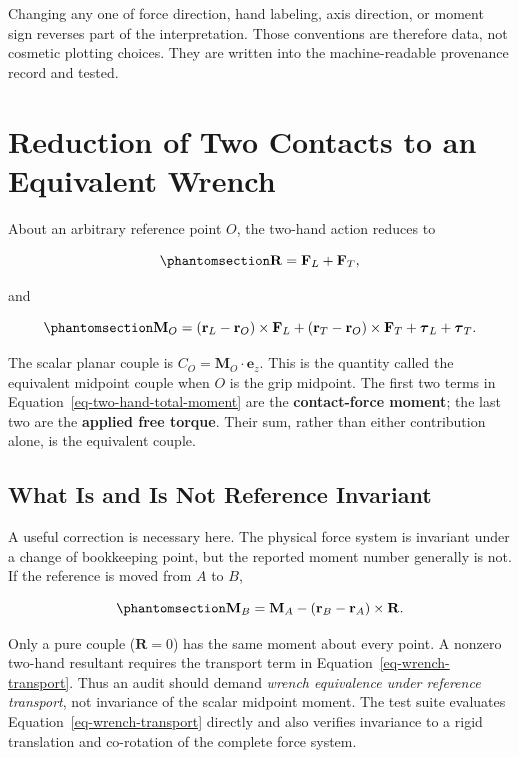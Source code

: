 \documentclass[
  letterpaper,
]{report}
\begin{document}
Changing any one of force direction, hand labeling, axis direction, or
moment sign reverses part of the interpretation. Those conventions are
therefore data, not cosmetic plotting choices. They are written into the
machine-readable provenance record and tested.

\section{Reduction of Two Contacts to an Equivalent
Wrench}\label{sec-two-hand-reduction}

About an arbitrary reference point \(O\), the two-hand action reduces to

\begin{equation}\phantomsection\label{eq-two-hand-resultant}{
\mathbf R = \mathbf F_L + \mathbf F_T,
}\end{equation}

and

\begin{equation}\phantomsection\label{eq-two-hand-total-moment}{
\mathbf M_O =
(\mathbf r_L-\mathbf r_O)\times\mathbf F_L
+(\mathbf r_T-\mathbf r_O)\times\mathbf F_T
+\boldsymbol\tau_L+\boldsymbol\tau_T.
}\end{equation}

The scalar planar couple is \(C_O=\mathbf M_O\cdot\mathbf e_z\). This is
the quantity called the equivalent midpoint couple when \(O\) is the
grip midpoint. The first two terms in
Equation~\ref{eq-two-hand-total-moment} are the \textbf{contact-force
moment}; the last two are the \textbf{applied free torque}. Their sum,
rather than either contribution alone, is the equivalent couple.

\subsection{What Is and Is Not Reference
Invariant}\label{sec-reference-transport}

A useful correction is necessary here. The physical force system is
invariant under a change of bookkeeping point, but the reported moment
number generally is not. If the reference is moved from \(A\) to \(B\),

\begin{equation}\phantomsection\label{eq-wrench-transport}{
\mathbf M_B = \mathbf M_A
-(\mathbf r_B-\mathbf r_A)\times\mathbf R.
}\end{equation}

Only a pure couple (\(\mathbf R=0\)) has the same moment about every
point. A nonzero two-hand resultant requires the transport term in
Equation~\ref{eq-wrench-transport}. Thus an audit should demand
\emph{wrench equivalence under reference transport}, not invariance of
the scalar midpoint moment. The test suite evaluates
Equation~\ref{eq-wrench-transport} directly and also verifies invariance
to a rigid translation and co-rotation of the complete force system.
\end{document}
